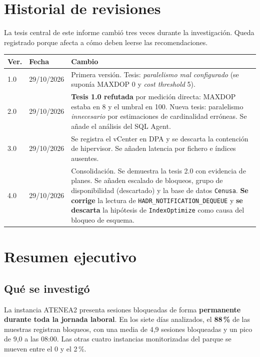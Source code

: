 \documentclass[11pt,a4paper]{article}
\newcommand{\cod}[1]{\texttt{\small #1}}
\newcommand{\critico}[1]{\textcolor{rojo}{\textbf{#1}}}
\begin{document}
\section*{Historial de revisiones}

La tesis central de este informe cambió tres veces durante la investigación.
Queda registrado porque afecta a cómo deben leerse las recomendaciones.

\begin{longtable}{p{1.1cm}p{2.1cm}p{12.4cm}}
\toprule
\textbf{Ver.} & \textbf{Fecha} & \textbf{Cambio} \\
\midrule
\endhead
1.0 & 29/10/2026 & Primera versión. Tesis: \emph{paralelismo mal
  configurado} (se suponía MAXDOP 0 y \emph{cost threshold} 5). \\
2.0 & 29/10/2026 & \critico{Tesis 1.0 refutada} por medición directa: MAXDOP
  estaba en 8 y el umbral en 100. Nueva tesis: paralelismo \emph{innecesario}
  por estimaciones de cardinalidad erróneas. Se añade el análisis del SQL
  Agent. \\
3.0 & 29/10/2026 & Se registra el vCenter en DPA y se descarta la contención
  de hipervisor. Se añaden latencia por fichero e índices ausentes. \\
4.0 & 29/10/2026 & Consolidación. Se demuestra la tesis 2.0 con evidencia de
  planes. Se añaden escalado de bloqueos, grupo de disponibilidad (descartado)
  y la base de datos \cod{Cenusa}. \critico{Se corrige} la lectura de
  \cod{HADR\_NOTIFICATION\_DEQUEUE} y \critico{se descarta} la hipótesis de
  \cod{IndexOptimize} como causa del bloqueo de esquema. \\
\bottomrule
\end{longtable}

\newpage
\tableofcontents
\newpage

\section{Resumen ejecutivo}

\subsection*{Qué se investigó}

La instancia ATENEA2 presenta sesiones bloqueadas de forma \textbf{permanente
durante toda la jornada laboral}. En los siete días analizados, el
\critico{88\,\%} de las muestras registran bloqueos, con una media de 4,9
sesiones bloqueadas y un pico de 9,0 a las 08:00. Las otras cuatro instancias
monitorizadas del parque se mueven entre el 0 y el 2\,\%.
\end{document}
